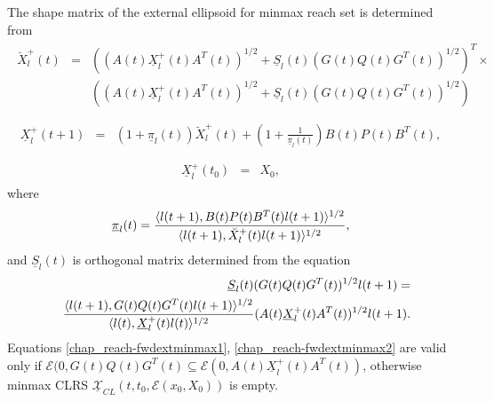 \documentclass[letterpaper,10pt,english]{sphinxmanual}
\begin{document}
The shape matrix of the external ellipsoid for minmax reach set is
determined from
\label{chap_reach:equation-fwdextminmax1}\begin{gather}
\begin{split}\breve{X}^+_l(t) & = &
\left((A(t)\underline{X}^+_l(t)A^T(t))^{1/2} +
\underline{S}_l(t)(G(t)Q(t)G^T(t))^{1/2}\right)^T
\times \nonumber \\
& &\left((A(t)\underline{X}^+_l(t)A^T(t))^{1/2} +
\underline{S}_l(t)(G(t)Q(t)G^T(t))^{1/2}\right)\\\end{split}\label{chap_reach-fwdextminmax1}
\end{gather}\label{chap_reach:equation-fwdextminmax2}\begin{gather}
\begin{split}\underline{X}^+_l(t+1) & = &
(1+\underline{\pi}_l(t))\breve{X}^+_l(t) +
\left(1+\frac{1}{\underline{\pi}_l(t)}\right)
B(t)P(t)B^T(t),\\\end{split}\label{chap_reach-fwdextminmax2}
\end{gather}\label{chap_reach:equation-fwdextminmax3}\begin{gather}
\begin{split}\underline{X}^+_l(t_0) & = & X_0,\end{split}\label{chap_reach-fwdextminmax3}
\end{gather}
where
\begin{gather}
\begin{split}\underline{\pi}_l(t) = \frac{\langle l(t+1),
B(t)P(t)B^T(t)l(t+1)\rangle^{1/2}}{\langle l(t+1),
\breve{X}^+_l(t)l(t+1)\rangle^{1/2}},\end{split}\notag
\end{gather}
and $\underline{S}_l(t)$ is orthogonal matrix determined from the
equation
\begin{gather}
\begin{split}\begin{aligned}
& & \underline{S}_l(t)(G(t)Q(t)G^T(t))^{1/2}l(t+1) = \\
& & \frac{\langle l(t+1),
G(t)Q(t)G^T(t)l(t+1)\rangle^{1/2}}{\langle l(t),
\underline{X}^+_l(t)l(t)\rangle^{1/2}}(A(t)\underline{X}^+_l(t)A^T(t))^{1/2}l(t+1).\end{aligned}\end{split}\notag
\end{gather}
Equations \eqref{chap_reach-fwdextminmax1}, \eqref{chap_reach-fwdextminmax2} are valid only if
${\mathcal E}(0,G(t)Q(t)G^T(t)\subseteq{\mathcal E}(0,A(t)\underline{X}^+_l(t)A^T(t))$,
otherwise minmax CLRS
$\underline{{\mathcal X}}_{CL}(t,t_0,{\mathcal E}(x_0,X_0))$ is
empty.
\end{document}
